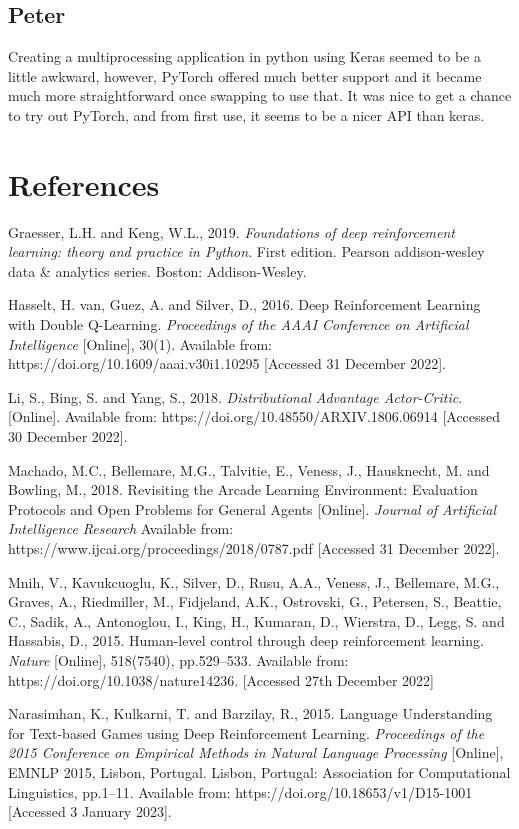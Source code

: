 \documentclass{article}
\begin{document}
\subsection{Peter}

Creating a multiprocessing application in python using Keras seemed to be a little awkward, however, PyTorch offered much better support and it became much more straightforward once swapping to use that. It was nice to get a chance to try out PyTorch, and from first use, it seems to be a nicer API than keras.

\section*{References}

\small 

Graesser, L.H. and Keng, W.L., 2019. \emph{Foundations of deep reinforcement learning: theory and practice in Python}. First edition. Pearson addison-wesley data \& analytics series. Boston: Addison-Wesley.

Hasselt, H. van, Guez, A. and Silver, D., 2016. Deep Reinforcement Learning with Double Q-Learning. \emph{Proceedings of the AAAI Conference on Artificial Intelligence} [Online], 30(1). Available from: https://doi.org/10.1609/aaai.v30i1.10295 [Accessed 31 December 2022].

Li, S., Bing, S. and Yang, S., 2018. \emph{Distributional Advantage Actor-Critic}. [Online]. Available from: https://doi.org/10.48550/ARXIV.1806.06914 [Accessed 30 December 2022].

Machado, M.C., Bellemare, M.G., Talvitie, E., Veness, J., Hausknecht, M. and Bowling, M., 2018. Revisiting the Arcade Learning Environment: Evaluation Protocols and Open Problems for General Agents [Online]. \emph{Journal of Artificial Intelligence Research}  Available from: https://www.ijcai.org/proceedings/2018/0787.pdf  [Accessed 31 December 2022].

Mnih, V., Kavukcuoglu, K., Silver, D., Rusu, A.A., Veness, J., Bellemare, M.G., Graves, A., Riedmiller, M., Fidjeland, A.K., Ostrovski, G., Petersen, S., Beattie, C., Sadik, A., Antonoglou, I., King, H., Kumaran, D., Wierstra, D., Legg, S. and Hassabis, D., 2015. Human-level control through deep reinforcement learning. \emph{Nature} [Online], 518(7540), pp.529–533. Available from: https://doi.org/10.1038/nature14236. [Accessed 27th December 2022]

Narasimhan, K., Kulkarni, T. and Barzilay, R., 2015. Language Understanding for Text-based Games using Deep Reinforcement Learning. \emph{Proceedings of the 2015 Conference on Empirical Methods in Natural Language Processing} [Online], EMNLP 2015, Lisbon, Portugal. Lisbon, Portugal: Association for Computational Linguistics, pp.1–11. Available from: https://doi.org/10.18653/v1/D15-1001 [Accessed 3 January 2023].
\end{document}
